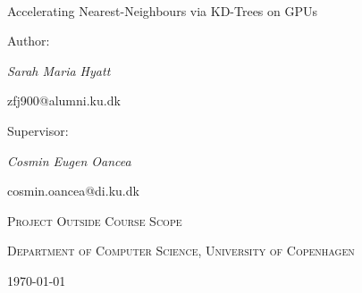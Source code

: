 \documentclass[12pt]{article}
\begin{document}
\begin{titlepage}
 \centering
 {\scshape\large ~~ \par}
 \vspace{4cm}  
 {\Huge Accelerating Nearest-Neighbours via KD-Trees on GPUs \par} %
 \vspace{2.5cm}
 {\scriptsize Author: \par}
 \vspace{0.1cm}
 {\normalsize\itshape Sarah Maria Hyatt \par}
 \vspace{0.2cm}
 {\scriptsize zfj900@alumni.ku.dk \par}
 \vspace{2cm}
 {\scriptsize Supervisor: \par}
 \vspace{0.1cm}
 {\normalsize\itshape Cosmin Eugen Oancea \par}
 \vspace{0.2cm}
 {\scriptsize cosmin.oancea@di.ku.dk \par}
 \vspace{2.5cm}
 \textsc{\small Project Outside Course Scope} \par
 \vspace{0.1cm}
 \textsc{\small Department of Computer Science, University of Copenhagen}\par
 \vfill
 {\small \today\par}
 \vspace{0.3cm}
\end{titlepage}

\tableofcontents


















\newpage


\end{document}
